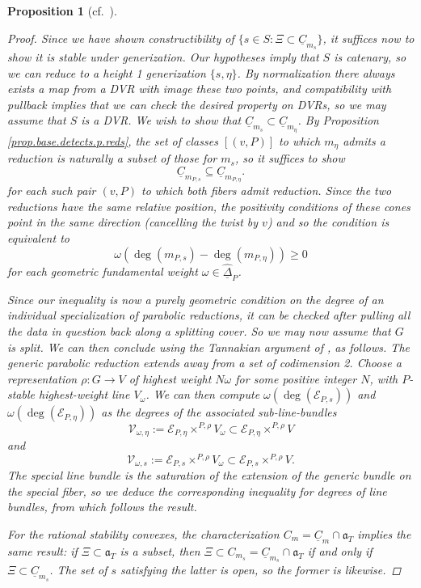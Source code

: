 \documentclass[openany]{amsbook}
\newtheorem{proposition}[theorem]{Proposition}
\theoremstyle{definition}
\theoremstyle{remark}
\numberwithin{equation}{section}
\newcommand{\cE}{\mathcal{E}}
\newcommand{\ul}[1]{\underline{#1}}
\renewcommand{\-}{\operatorname{-}}
\renewcommand{\a}{\mathfrak{a}}
\begin{document}
\begin{proposition}[{{cf.\ \cite[Prop. 5.6.1]{CLI}}}]
\begin{proof}
        Since we have shown constructibility of $\{s \in S : \Xi \subset \ul{C}_{m_s}\}$, it suffices now to show it is stable under generization. Our hypotheses imply that $S$ is catenary, so we can reduce to a height 1 generization $\{s, \eta\}$. By normalization there always exists a map from a DVR with image these two points, and compatibility with pullback implies that we can check the desired property on DVRs, so we may assume that $S$ is a DVR. We wish to show that $\ul{C}_{m_s} \subset \ul{C}_{m_\eta}$. By Proposition \ref{prop.base.detects.p.reds}, the set of classes $[(v,P)]$ to which $m_\eta$ admits a reduction is naturally a subset of those for $m_s$, so it suffices to show 
        $$
            \ul{C}_{m_{P,s}} \subseteq \ul{C}_{m_{P, \eta}}.
        $$
        for each such pair $(v,P)$ to which both fibers admit reduction.
        Since the two reductions have the same relative position, the positivity conditions of these cones point in the same direction (cancelling the twist by $v$) and so the condition is equivalent to
        $$
            \omega(\deg(m_{P,s}) - \deg(m_{P, \eta})) \ge 0
        $$
        for each geometric fundamental weight $\omega \in \hat{\ul{\Delta}}_P$. 

        Since our inequality is now a purely geometric condition on the degree of an individual specialization of parabolic reductions, it can be checked after pulling all the data in question back along a splitting cover. So we may now assume that $G$ is split. We can then conclude using the Tannakian argument of \cite[Prop. 5.6.1]{CLI}, as follows. The generic parabolic reduction extends away from a set of codimension 2. Choose a representation $\rho : G \to V$ of highest weight $N\omega$ for some positive integer $N$, with $P$-stable highest-weight line $V_\omega$. We can then compute $\omega(\deg(\cE_{P,s}))$ and $\omega(\deg(\cE_{P, \eta}))$ as the degrees of the associated sub-line-bundles 
        $$
            \mathcal{V}_{\omega, \eta} := \cE_{P, \eta} \times^{P, \rho} V_\omega \subset \cE_{P, \eta} \times^{P, \rho} V
        $$
        and
        $$
            \mathcal{V}_{\omega, s} := \cE_{P,s} \times^{P, \rho} V_\omega \subset \cE_{P, s} \times^{P, \rho} V.
        $$
        The special line bundle is the saturation of the extension of the generic bundle on the special fiber, so we deduce the corresponding inequality for degrees of line bundles, from which follows the result.

        For the rational stability convexes, the characterization $C_m = \ul{C}_m \cap \a_T$ implies the same result: if $\Xi \subset \a_T$ is a subset, then $\Xi \subset C_{m_s} = \ul{C}_{m_s} \cap \a_T$ if and only if $\Xi \subset \ul{C}_{m_s}$. The set of $s$ satisfying the latter is open, so the former is likewise.
        \end{proof}
\end{proposition}
\end{document}
